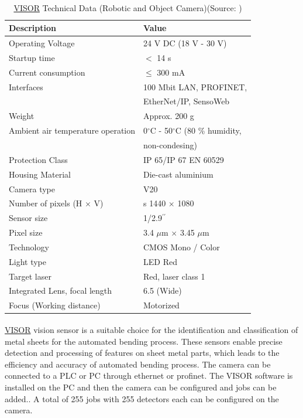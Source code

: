 \begin{table}[h!]
    \centering
    \small
    \renewcommand{\arraystretch}{1.2} %
    \begin{tabular}{ll}
        \textbf{Description} & \textbf{Value} \\ \hline
        Operating Voltage & 24 V DC (18 V - 30 V) \\
        Startup time & $<$ 14 s\\
        Current consumption & $\leq$ 300 mA \\
        Interfaces & 100 Mbit LAN, PROFINET,\\
        & EtherNet/IP, SensoWeb\\ 
        Weight & Approx. 200 g \\ 
        Ambient air temperature operation & 0$^\circ$C - 50$^\circ$C (80 \% humidity,\\
        & non-condesing) \\ 
        Protection Class & IP 65/IP 67 EN 60529\\
        Housing Material & Die-cast aluminium\\
        Camera type & V20 \\ 
        Number of pixels (H $\times$ V) &s 1440 $\times$ 1080\\
        Sensor size & 1/2.9$^{\prime\prime}$ \\ 
        Pixel size & 3.4 $\mu$m $\times$ 3.45 $\mu$m\\
        Technology & CMOS Mono / Color\\
        Light type & LED Red\\ 
        Target laser & Red, laser class 1\\ 
        Integrated Lens, focal length & 6.5 (Wide)\\
        Focus (Working distance) & Motorized \\ \hline
    \end{tabular}
    \caption{\hyperref[acro:VISOR]{VISOR}\textsuperscript{\textregistered} Technical Data (Robotic and Object Camera)(Source: \cite{visor_user_manual})}
    \label{visor-technical-data}
\end{table}

\hyperref[acro:VISOR]{VISOR}\textsuperscript{\textregistered} vision sensor is a suitable choice for the identification and classification of metal sheets for the automated bending process. These sensors enable precise detection and processing of features on sheet metal parts, which leads to the efficiency and accuracy of automated bending process. The camera can be connected to a PLC or PC through ethernet or profinet. The VISOR software is installed on the PC and then the camera can be configured and jobs can be added.\cite{sensopart-software}. A total of 255 jobs with 255 detectors each can be configured on the camera.

